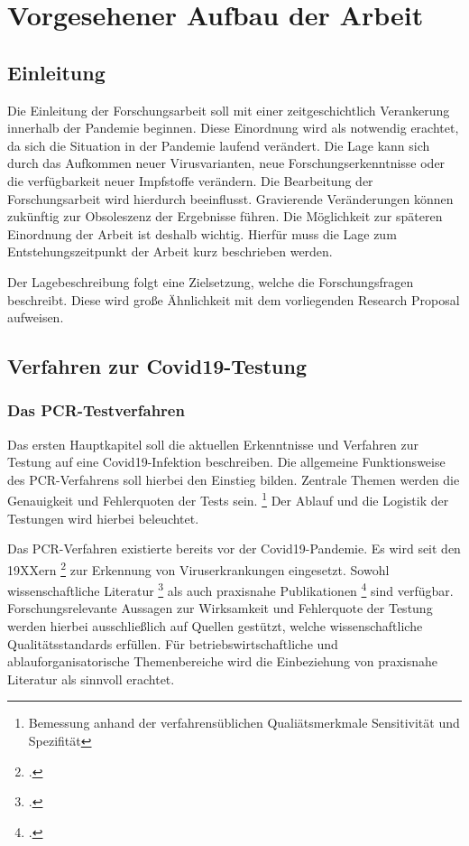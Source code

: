 
\chapter{Vorgesehener Aufbau der Arbeit}
\section{Einleitung}
Die Einleitung der Forschungsarbeit soll mit einer zeitgeschichtlich Verankerung innerhalb der Pandemie beginnen.
Diese Einordnung wird als notwendig erachtet, da sich die Situation in der Pandemie laufend verändert.
Die Lage kann sich durch das Aufkommen neuer Virusvarianten, neue Forschungserkenntnisse oder die verfügbarkeit neuer Impfstoffe verändern.
Die Bearbeitung der Forschungsarbeit wird hierdurch beeinflusst.
Gravierende Veränderungen können zukünftig zur Obsoleszenz der Ergebnisse führen.
Die Möglichkeit zur späteren Einordnung der Arbeit ist deshalb wichtig.
Hierfür muss die Lage zum Entstehungszeitpunkt der Arbeit kurz beschrieben werden.

Der Lagebeschreibung folgt eine Zielsetzung, welche die Forschungsfragen beschreibt.
Diese wird große Ähnlichkeit mit dem vorliegenden Research Proposal aufweisen.

\section{Verfahren zur Covid19-Testung}
\subsection{Das PCR-Testverfahren}
Das ersten Hauptkapitel soll die aktuellen Erkenntnisse und Verfahren zur Testung auf eine Covid19-Infektion beschreiben.
Die allgemeine Funktionsweise des PCR-Verfahrens soll hierbei den Einstieg bilden.
Zentrale Themen werden die Genauigkeit und Fehlerquoten der Tests sein.
\footnote{Bemessung anhand der verfahrensüblichen Qualiätsmerkmale Sensitivität und Spezifität}
Der Ablauf und die Logistik der Testungen wird hierbei beleuchtet.

Das PCR-Verfahren existierte bereits vor der Covid19-Pandemie.
Es wird seit den 19XXern
\footcite{Quelle erster Masseneinsatz PCR}
zur Erkennung von Viruserkrankungen eingesetzt.
Sowohl wissenschaftliche Literatur
\footcite{Wissenschaftlich PCR}
als auch praxisnahe Publikationen
\footcite{Praxishandbuch PCR}
sind verfügbar.
Forschungsrelevante Aussagen zur Wirksamkeit und Fehlerquote der Testung werden hierbei ausschließlich auf Quellen gestützt, welche wissenschaftliche Qualitätsstandards erfüllen.
Für betriebswirtschaftliche und ablauforganisatorische Themenbereiche wird die Einbeziehung von praxisnahe Literatur als sinnvoll erachtet.

